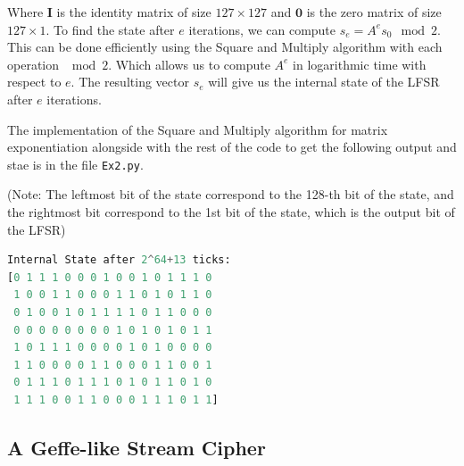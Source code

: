 \documentclass{article}
\begin{document}
Where $\textbf{I}$ is the identity matrix of size $127 \times 127$ and $\textbf{0}$ is the zero matrix of size $127 \times 1$.
To find the state after $e$ iterations, we can compute $s_e = A^e s_0 \mod 2$. This can be done efficiently using the Square and Multiply algorithm with each operation $\mod 2$.
Which allows us to compute $A^e$ in logarithmic time with respect to $e$. The resulting vector $s_e$ will give us the internal state of the LFSR after $e$ iterations.

The implementation of the Square and Multiply algorithm for matrix exponentiation alongside with the rest of the code to get the following output and stae is in the file \texttt{Ex2.py}.

(Note: The leftmost bit of the state correspond to the 128-th bit of the state, and the rightmost bit correspond to the 1st bit of the state, which is the output bit of the LFSR)
\begin{lstlisting}[language=python]
Internal State after 2^64+13 ticks: 
[0 1 1 1 0 0 0 1 0 0 1 0 1 1 1 0
 1 0 0 1 1 0 0 0 1 1 0 1 0 1 1 0
 0 1 0 0 1 0 1 1 1 1 0 1 1 0 0 0
 0 0 0 0 0 0 0 0 1 0 1 0 1 0 1 1
 1 0 1 1 1 0 0 0 0 1 0 1 0 0 0 0
 1 1 0 0 0 0 1 1 0 0 0 1 1 0 0 1
 0 1 1 1 0 1 1 1 0 1 0 1 1 0 1 0
 1 1 1 0 0 1 1 0 0 0 1 1 1 0 1 1]
\end{lstlisting}

\subsection{A Geffe-like Stream Cipher}
\end{document}
